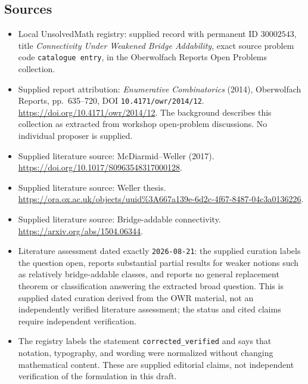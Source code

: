 \documentclass[11pt]{article}
\begin{document}
\subsection{Sources}
\begin{itemize}
\item Local UnsolvedMath registry: supplied record with permanent ID \(30002543\), title \emph{Connectivity Under Weakened Bridge Addability}, exact source problem code \texttt{catalogue entry}, in the Oberwolfach Reports Open Problems collection.
\item Supplied report attribution: \emph{Enumerative Combinatorics} (2014), Oberwolfach Reports, pp.~635--720, DOI \texttt{10.4171/owr/2014/12}. \url{https://doi.org/10.4171/owr/2014/12}. The background describes this collection as extracted from workshop open-problem discussions. No individual proposer is supplied.
\item Supplied literature source: McDiarmid--Weller (2017). \url{https://doi.org/10.1017/S0963548317000128}.
\item Supplied literature source: Weller thesis. \url{https://ora.ox.ac.uk/objects/uuid%3A667a139e-6d2c-4f67-8487-04c3a0136226}.
\item Supplied literature source: Bridge-addable connectivity. \url{https://arxiv.org/abs/1504.06344}.
\item Literature assessment dated exactly \texttt{2026-08-21}: the supplied curation labels the question open, reports substantial partial results for weaker notions such as relatively bridge-addable classes, and reports no general replacement theorem or classification answering the extracted broad question. This is supplied dated curation derived from the OWR material, not an independently verified literature assessment; the status and cited claims require independent verification.
\item The registry labels the statement \texttt{corrected\_verified} and says that notation, typography, and wording were normalized without changing mathematical content. These are supplied editorial claims, not independent verification of the formulation in this draft.
\end{itemize}
\end{document}

